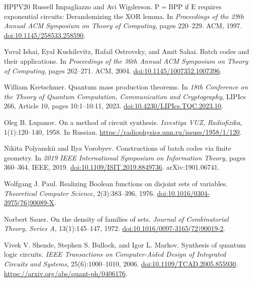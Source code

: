 \documentclass[11pt]{article}
\begin{document}
\begin{thebibliography}{HPPV20}
Russell Impagliazzo and Avi Wigderson.
\newblock $\mathrm{P}=\mathrm{BPP}$ if $\mathrm{E}$ requires exponential
circuits: Derandomizing the XOR lemma.
\newblock In \emph{Proceedings of the 29th Annual ACM Symposium on Theory
of Computing}, pages 220--229. ACM, 1997.
\newblock \href{https://doi.org/10.1145/258533.258590}{doi:10.1145/258533.258590}.

Yuval Ishai, Eyal Kushilevitz, Rafail Ostrovsky, and Amit Sahai.
\newblock Batch codes and their applications.
\newblock In \emph{Proceedings of the 36th Annual ACM Symposium on Theory of
Computing}, pages 262--271. ACM, 2004.
\newblock \href{https://doi.org/10.1145/1007352.1007396}{doi:10.1145/1007352.1007396}.

William Kretschmer.
\newblock Quantum mass production theorems.
\newblock In \emph{18th Conference on the Theory of Quantum Computation,
Communication and Cryptography}, LIPIcs 266, Article 10, pages 10:1--10:11,
2023.
\newblock \href{https://doi.org/10.4230/LIPIcs.TQC.2023.10}{doi:10.4230/LIPIcs.TQC.2023.10}.

Oleg B. Lupanov.
\newblock On a method of circuit synthesis.
\newblock \emph{Izvestiya VUZ, Radiofizika}, 1(1):120--140, 1958.
\newblock In Russian.
\newblock \url{https://radiophysics.unn.ru/issues/1958/1/120}.

Nikita Polyanskii and Ilya Vorobyev.
\newblock Constructions of batch codes via finite geometry.
\newblock In \emph{2019 IEEE International Symposium on Information Theory},
pages 360--364. IEEE, 2019.
\newblock \href{https://doi.org/10.1109/ISIT.2019.8849736}{doi:10.1109/ISIT.2019.8849736}.
\newblock arXiv:1901.06741.

Wolfgang J. Paul.
\newblock Realizing Boolean functions on disjoint sets of variables.
\newblock \emph{Theoretical Computer Science}, 2(3):383--396, 1976.
\newblock \href{https://doi.org/10.1016/0304-3975(76)90089-X}{doi:10.1016/0304-3975(76)90089-X}.

Norbert Sauer.
\newblock On the density of families of sets.
\newblock \emph{Journal of Combinatorial Theory, Series A}, 13(1):145--147, 1972.
\newblock \href{https://doi.org/10.1016/0097-3165(72)90019-2}{doi:10.1016/0097-3165(72)90019-2}.

Vivek V. Shende, Stephen S. Bullock, and Igor L. Markov.
\newblock Synthesis of quantum logic circuits.
\newblock \emph{IEEE Transactions on Computer-Aided Design of Integrated
Circuits and Systems}, 25(6):1000--1010, 2006.
\newblock \href{https://doi.org/10.1109/TCAD.2005.855930}{doi:10.1109/TCAD.2005.855930}.
\newblock \url{https://arxiv.org/abs/quant-ph/0406176}.


\end{thebibliography}
\end{document}
